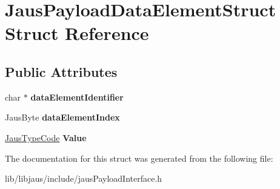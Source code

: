 \hypertarget{struct_jaus_payload_data_element_struct}{\section{\-Jaus\-Payload\-Data\-Element\-Struct \-Struct \-Reference}
\label{struct_jaus_payload_data_element_struct}
}
\subsection*{\-Public \-Attributes}
\begin{DoxyCompactItemize}
\item 
\hypertarget{struct_jaus_payload_data_element_struct_a5bc6cdbbea97b4523d89c0f1684d1229}{char $\ast$ {\bfseries data\-Element\-Identifier}}\label{struct_jaus_payload_data_element_struct_a5bc6cdbbea97b4523d89c0f1684d1229}

\item 
\hypertarget{struct_jaus_payload_data_element_struct_a3e052fc1c7a0057c797799007163ac31}{\-Jaus\-Byte {\bfseries data\-Element\-Index}}\label{struct_jaus_payload_data_element_struct_a3e052fc1c7a0057c797799007163ac31}

\item 
\hypertarget{struct_jaus_payload_data_element_struct_a3f68bf4b68b68599780eb8d0393d1d17}{\hyperlink{union_jaus_type_code}{\-Jaus\-Type\-Code} {\bfseries \-Value}}\label{struct_jaus_payload_data_element_struct_a3f68bf4b68b68599780eb8d0393d1d17}

\end{DoxyCompactItemize}


\-The documentation for this struct was generated from the following file\-:\begin{DoxyCompactItemize}
\item 
lib/libjaus/include/jaus\-Payload\-Interface.\-h\end{DoxyCompactItemize}
